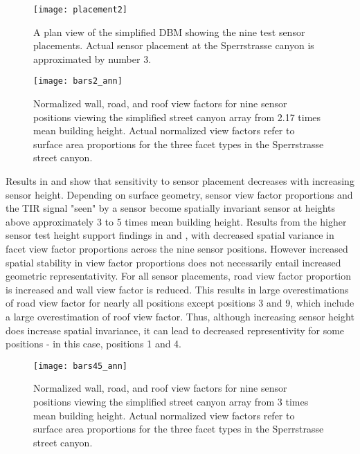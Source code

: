  \begin{figure}[H]
	\centering
	\texttt{[image: placement2]}
	\caption{A plan view of the simplified DBM showing the nine test sensor placements. Actual sensor placement at the Sperrstrasse canyon is approximated by number 3.}
	\label{placement}
\end{figure}

 \begin{figure}[H]
	\centering
	\texttt{[image: bars2\_ann]}
	\caption{Normalized wall, road, and roof view factors for nine sensor positions viewing the simplified street canyon array from 2.17 times mean building height. Actual normalized view factors refer to surface area proportions for the three facet types in the Sperrstrasse street canyon. }
	\label{bars1}
 \end{figure}

Results in \citet{Adderley2015} and \citet{Roberts2010} show that sensitivity to sensor placement decreases with increasing sensor height. Depending on surface geometry, sensor view factor proportions and the TIR signal "seen" by a sensor become spatially invariant sensor at heights above approximately 3 to 5 times mean building height. Results from the higher sensor test height support findings in \citet{Adderley2015} and \citet{Roberts2010}, with decreased spatial variance in facet view factor proportions across the nine sensor positions. However increased spatial stability in view factor proportions does not necessarily entail increased geometric representativity. For all sensor placements, road view factor proportion is increased and wall view factor is reduced. This results in large overestimations of road view factor for nearly all positions except positions 3 and 9, which include a large overestimation of roof view factor. Thus, although increasing sensor height does increase spatial invariance, it can lead to decreased representivity for some positions - in this case, positions 1 and 4.

\begin{figure}[H]
	\centering
	\texttt{[image: bars45\_ann]}
	\caption{Normalized wall, road, and roof view factors for nine sensor positions viewing the simplified street canyon array from 3 times mean building height. Actual normalized view factors refer to surface area proportions for the three facet types in the Sperrstrasse street canyon. }
	\label{bars45}
\end{figure}

